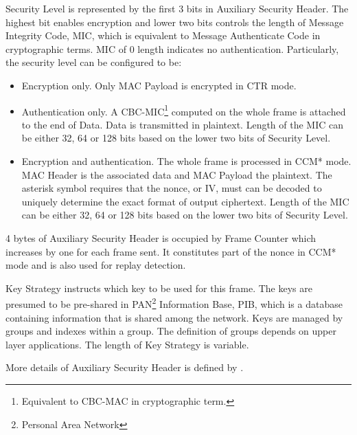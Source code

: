 \begin{description}[style=nextline]
	\item[\textbf{Security Level}]
	Security Level is represented by the first 3 bits in Auxiliary Security Header. The highest bit enables encryption and lower two bits controls the length of Message Integrity Code, MIC, which is equivalent to Message Authenticate Code in cryptographic terms.  MIC of $0$ length indicates no authentication. Particularly, the security level can be configured to be:
	\begin{itemize}
		\item Encryption only. Only MAC Payload is encrypted in CTR mode.
		\item Authentication only. A CBC-MIC\footnote{Equivalent to CBC-MAC in cryptographic term.} computed on the whole frame is attached to the end of Data. Data is transmitted in plaintext. Length of the MIC can be either 32, 64 or 128 bits based on the lower two bits of Security Level.
		\item Encryption and authentication. The whole frame is processed in CCM*\cite{802154} mode. MAC Header is the associated data and MAC Payload the plaintext. The asterisk symbol requires that the nonce, or IV, must can be decoded to uniquely determine the exact format of output ciphertext. Length of the MIC can be either 32, 64 or 128 bits based on the lower two bits of Security Level.
	\end{itemize}
	\item[\textbf{Frame Counter}]
	4 bytes of Auxiliary Security Header is occupied by Frame Counter which increases by one for each frame sent. It constitutes part of the nonce in CCM* mode and is also used for replay detection.
	\item[\textbf{Key Strategy}]
	Key Strategy instructs which key to be used for this frame. The keys are presumed to be pre-shared in PAN\footnote{Personal Area Network} Information Base, PIB, which is a database containing information that is shared among the network. Keys are managed by groups and indexes within a group. The definition of groups depends on upper layer applications. The length of Key Strategy is variable.
\end{description}

More details of Auxiliary Security Header is defined by \cite{802154}.

